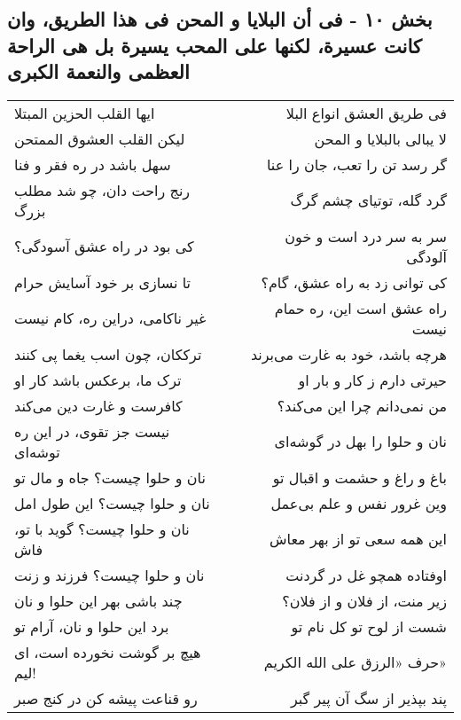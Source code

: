 \begin{center}
\section*{بخش ۱۰ - فی أن البلایا و المحن فی هذا الطریق، وان کانت عسیرة، لکنها علی المحب یسیرة بل  هی الراحة العظمی والنعمة الکبری}
\label{sec:010}
\begin{longtable}{l p{0.5cm} r}
ایها القلب الحزین المبتلا
&&
فی طریق العشق انواع البلا
\\
لیکن القلب العشوق الممتحن
&&
لا یبالی بالبلایا و المحن
\\
سهل باشد در ره فقر و فنا
&&
گر رسد تن را تعب، جان را عنا
\\
رنج راحت دان، چو شد مطلب بزرگ
&&
گرد گله، توتیای چشم گرگ
\\
کی بود در راه عشق آسودگی؟
&&
سر به سر درد است و خون آلودگی
\\
تا نسازی بر خود آسایش حرام
&&
کی توانی زد به راه عشق، گام؟
\\
غیر ناکامی، دراین ره، کام نیست
&&
راه عشق است این، ره حمام نیست
\\
ترککان، چون اسب یغما پی کنند
&&
هرچه باشد، خود به غارت می‌برند
\\
ترک ما، برعکس باشد کار او
&&
حیرتی دارم ز کار و بار او
\\
کافرست و غارت دین می‌کند
&&
من نمی‌دانم چرا این می‌کند؟
\\
نیست جز تقوی، در این ره توشه‌ای
&&
نان و حلوا را بهل در گوشه‌ای
\\
نان و حلوا چیست؟ جاه و مال تو
&&
باغ و راغ و حشمت و اقبال تو
\\
نان و حلوا چیست؟ این طول امل
&&
وین غرور نفس و علم بی‌عمل
\\
نان و حلوا چیست؟ گوید با تو، فاش
&&
این همه سعی تو از بهر معاش
\\
نان و حلوا چیست؟ فرزند و زنت
&&
اوفتاده همچو غل در گردنت
\\
چند باشی بهر این حلوا و نان
&&
زیر منت، از فلان و از فلان؟
\\
برد این حلوا و نان، آرام تو
&&
شست از لوح تو کل نام تو
\\
هیچ بر گوشت نخورده است، ای لیم!
&&
حرف «الرزق علی الله الکریم»
\\
رو قناعت پیشه کن در کنج صبر
&&
پند بپذیر از سگ آن پیر گبر
\\
\end{longtable}
\end{center}
